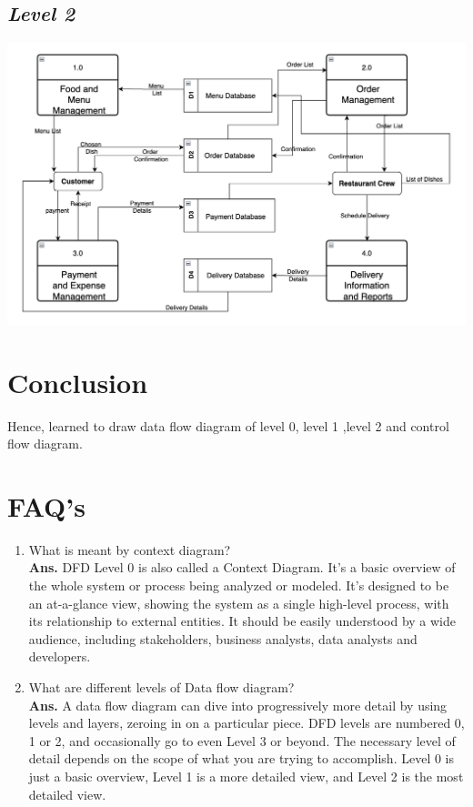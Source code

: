 \documentclass{article}
\begin{document}
\subsection{\textbf{\textit{Level 2}}}
\begin{center}
\includegraphics[scale=0.6]{level2.png}
\end{center}

\section{\textbf{Conclusion}}
Hence, learned to draw data flow diagram of level 0, level 1 ,level 2 and control flow diagram.

\section{\textbf{FAQ's}}
\begin{enumerate}
	\item What is meant by context diagram?\\
	
	\textbf{Ans.}  DFD Level 0 is also called a Context Diagram. It’s a basic overview of the whole system or process being analyzed or modeled. It’s designed to be an at-a-glance view, showing the system as a single high-level process, with its relationship to external entities. It should be easily understood by a wide audience, including stakeholders, business analysts, data analysts and developers.
	\item What are different levels of Data flow diagram?\\
	
	\textbf{Ans.} A data flow diagram can dive into progressively more detail by using levels and layers, zeroing in on a particular piece. DFD levels are numbered 0, 1 or 2, and occasionally go to even Level 3 or beyond. The necessary level of detail depends on the scope of what you are trying to accomplish. Level 0 is just a basic overview, Level 1 is a more detailed view, and Level 2 is the most detailed view.
	
\end{enumerate}
\end{document}
